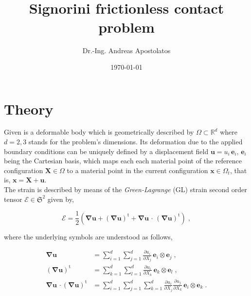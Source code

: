 \documentclass[10pt,a4paper]{article}
\title{Signorini frictionless contact problem}
\author{Dr.-Ing. Andreas Apostolatos}
\date{\today}
\begin{document}
\maketitle

\section{Theory}\label{sec:variational_formulation}

Given is a deformable body which is geometrically described by $\Omega \subset \mathbb{R}^d$ where $d = 2,3$ stands for the problem's dimensions. Its deformation due to the applied boundary conditions can be uniquely defined by a displacement field $\mathbf{u} = u_i \, \mathbf{e}_i$, $\mathbf{e}_i$ being the Cartesian basis, which maps each each material point of the reference configuration $\mathbf{X} \in \Omega$ to a material point in the current configuration $\mathbf{x} \in \Omega_t$, that is, $\mathbf{x} = \mathbf{X} + \mathbf{u}$.\\

The strain is described by means of the \textit{Green-Lagrange} (GL) strain second order tensor $\boldsymbol{\mathcal{E}} \in \mathfrak{S}^2$ given by,

\begin{equation}
	\boldsymbol{\mathcal{E}} = \frac{1}{2} \left( \boldsymbol{\nabla} \mathbf{u} + \left( \boldsymbol{\nabla} \mathbf{u} \right)^{\text{t}} +  \boldsymbol{\nabla} \mathbf{u} \, \cdot \, \left( \boldsymbol{\nabla} \mathbf{u} \right)^{\text{t}} \right) \;, \label{eq:GL_strain}
\end{equation}

where the underlying symbols are understood as follows,

\begin{subequations}
	\begin{alignat}{1}
		\boldsymbol{\nabla} \mathbf{u} &= \sum_{i = 1}^d \sum_{j = 1}^d \frac{\partial u_i}{\partial X_j} \, \mathbf{e}_i \otimes \mathbf{e}_j \;, \label{eq:nabla_u} \\
		\left( \boldsymbol{\nabla} \mathbf{u} \right)^{\text{t}} &= \sum_{k = 1}^d \sum_{l = 1}^d \frac{\partial u_l}{\partial X_k} \, \mathbf{e}_k \otimes \mathbf{e}_l \;, \label{eq:nabla_u_t} \\
		\boldsymbol{\nabla} \mathbf{u} \, \cdot \left( \boldsymbol{\nabla} \mathbf{u} \right)^{\text{t}} &= \sum_{i = 1}^d \sum_{j = 1}^d \sum_{k = 1}^d \frac{\partial u_i}{\partial X_j} \frac{\partial u_j}{\partial X_k} \, \mathbf{e}_i \otimes \mathbf{e}_k \;. \label{eq:nabla_u_times_u_t}
	\end{alignat}
\end{subequations}
\end{document}
